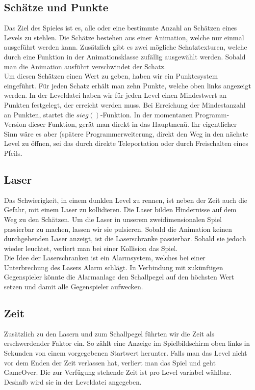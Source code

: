 \documentclass[11pt,a4paper]{scrbook}
\begin{document}
\subsection{Schätze und Punkte}
\label{Schaetze}
Das Ziel des Spieles ist es, alle oder eine bestimmte Anzahl an Schätzen eines Levels zu stehlen.
Die Schätze bestehen aus einer Animation, welche nur einmal ausgeführt werden kann.
Zusätzlich gibt es zwei mögliche Schatztexturen, welche durch eine Funktion in der Animationsklasse zufällig ausgewählt werden.
Sobald man die Animation ausführt verschwindet der Schatz.
\\
Um diesen Schätzen einen Wert zu geben, haben wir ein Punktesystem eingeführt.
Für jeden Schatz erhält man zehn Punkte, welche oben links angezeigt werden.
In der Leveldatei haben wir für jeden Level einen Mindestwert an Punkten festgelegt, der erreicht werden muss.
Bei Erreichung der Mindestanzahl an Punkten, startet die $sieg()$-Funktion.
In der momentanen Programm-Version dieser Funktion, gerät man direkt in das Hauptmenü.
Ihr eigentlicher Sinn wäre es aber (spätere Programmerweiterung, direkt den Weg in den nächste Level zu öffnen, sei das durch direkte Teleportation oder durch Freischalten eines Pfeils.    

\subsection{Laser}
Das Schwierigkeit, in einem dunklen Level zu rennen, ist neben der Zeit auch die Gefahr, mit einem Laser zu kollidieren.
Die Laser bilden Hindernisse auf dem Weg zu den Schätzen.
Um die Laser in unserem zweidimensionalen Spiel passierbar zu machen, lassen wir sie pulsieren.
Sobald die Animation keinen durchgehenden Laser anzeigt, ist die Laserschranke passierbar.
Sobald sie jedoch wieder leuchtet, verliert man bei einer Kollision das Spiel.
\\
Die Idee der Laserschranken ist ein Alarmsystem, welches bei einer Unterbrechung des Lasers Alarm schlägt. In Verbindung mit zukünftigen Gegenspieler könnte die Alarmanlage den Schallpegel auf den höchsten Wert setzen und damit alle Gegenspieler aufwecken.

\subsection{Zeit}
\label{Zeitlimit}
Zusätzlich zu den Lasern und zum Schallpegel führten wir die Zeit als erschwerdender Faktor ein. 
So zählt eine Anzeige im Spielbildschirm oben links in Sekunden von einem vorgegebenen Startwert herunter. Falls man das Level nicht vor dem Enden der Zeit verlassen hat, verliert man das Spiel und geht GameOver. Die zur Verfügung stehende Zeit ist pro Level variabel wählbar. Deshalb wird sie in der Leveldatei angegeben.
    
\end{document}
